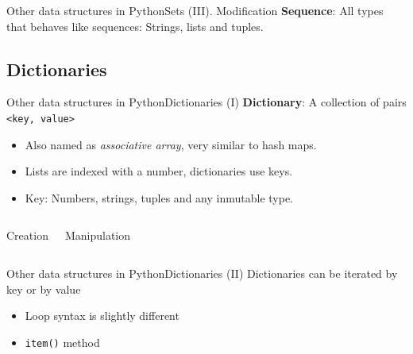 \documentclass[10pt,compress]{beamer} %
\begin{document}
{\begin{frame}[plain]{Other data structures in Python}{Sets (III). Modification}
	\vspace{0.1cm}
    \normalsize \textbf{Sequence}: All types that behaves like sequences: Strings, lists and tuples.
\end{frame}

\subsection{Dictionaries}
\begin{frame}{Other data structures in Python}{Dictionaries (I)}
	\textbf{Dictionary}: A collection of pairs \texttt{<key, value>}
		\begin{itemize}
		\item Also named as \textit{associative array}, very similar to hash maps.
		\item Lists are indexed with a number, dictionaries use keys.
		\item Key: Numbers, strings, tuples and any inmutable type.
		\end{itemize}

		\vspace{-0.3cm}
    \begin{columns}
		\begin{block}{Creation}
		\vspace{-0.2cm}
		
		\vspace{-0.2cm}
		\end{block}
		\vspace{0.7cm}

		\begin{block}{Manipulation}
		\vspace{-0.2cm}
		
		\vspace{-0.2cm}
		\end{block}

	\end{columns}
\end{frame}

\begin{frame}{Other data structures in Python}{Dictionaries (II)}
	Dictionaries can be iterated by key or by value
		\begin{itemize}
		\item Loop syntax is slightly different
		\item \texttt{item()} method
		\end{itemize}


\end{frame}}
\end{document}
